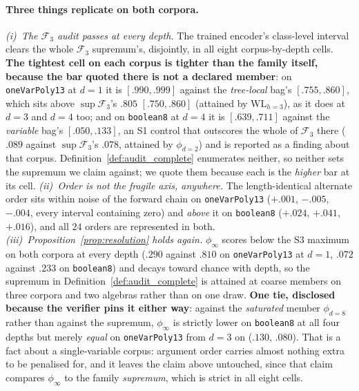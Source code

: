 \paragraph{Three things replicate on both corpora.} \emph{(i)~The $\mathcal{F}_3$ audit passes at every depth.} The trained encoder's class-level interval clears the whole $\mathcal{F}_3$ supremum's, disjointly, in all eight corpus-by-depth cells. \textbf{The tightest cell on each corpus is tighter than the family itself, because the bar quoted there is not a declared member}: on \texttt{oneVarPoly13} at $d{=}1$ it is $[.990,.999]$ against the \emph{tree-local} bag's $[.755,.860]$, which sits above $\sup\mathcal{F}_3$'s $.805$ $[.750,.860]$ (attained by $\mathrm{WL}_{h=3}$), as it does at $d{=}3$ and $d{=}4$ too; and on \texttt{boolean8} at $d{=}4$ it is $[.639,.711]$ against the \emph{variable} bag's $[.050,.133]$, an S1 control that outscores the whole of $\mathcal{F}_3$ there ($.089$ against $\sup\mathcal{F}_3$'s $.078$, attained by $\phi_{d=2}$) and is reported as a finding about that corpus. Definition~\ref{def:audit_complete} enumerates neither, so neither sets the supremum we claim against; we quote them because each is the \emph{higher} bar at its cell. \emph{(ii)~Order is not the fragile axis, anywhere.} The length-identical alternate order sits within noise of the forward chain on \texttt{oneVarPoly13} ($+.001$, $-.005$, $-.004$, every interval containing zero) and \emph{above} it on \texttt{boolean8} ($+.024$, $+.041$, $+.016$), and all $24$ orders are represented in both. \emph{(iii)~Proposition~\ref{prop:resolution} holds again.} $\phi_\infty$ scores below the S3 maximum on both corpora at every depth ($.290$ against $.810$ on \texttt{oneVarPoly13} at $d{=}1$, $.072$ against $.233$ on \texttt{boolean8}) and decays toward chance with depth, so the supremum in Definition~\ref{def:audit_complete} is attained at coarse members on three corpora and two algebras rather than on one draw. \textbf{One tie, disclosed because the verifier pins it either way}: against the \emph{saturated} member $\phi_{d{=}8}$ rather than against the supremum, $\phi_\infty$ is strictly lower on \texttt{boolean8} at all four depths but merely \emph{equal} on \texttt{oneVarPoly13} from $d{=}3$ on ($.130$, $.080$). That is a fact about a single-variable corpus: argument order carries almost nothing extra to be penalised for, and it leaves the claim above untouched, since that claim compares $\phi_\infty$ to the family \emph{supremum}, which is strict in all eight cells.

